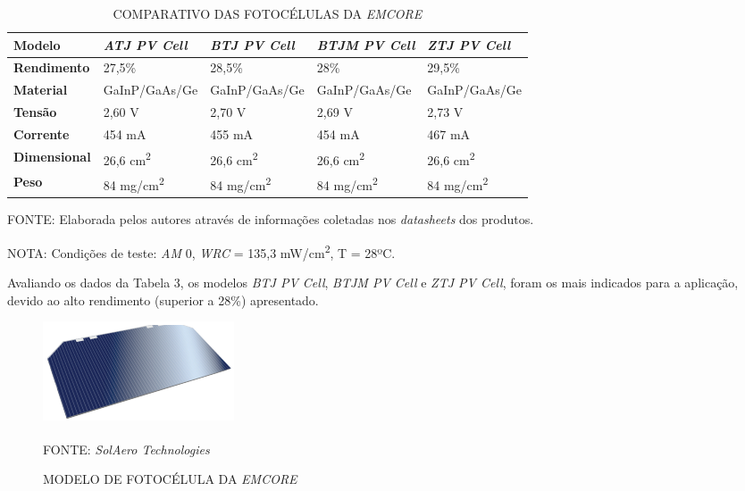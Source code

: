 \documentclass[
	12pt,				%
	openright,			%
	oneside,			%
	a4paper,			%
	english,			%
	french,				%
	spanish,			%
	brazil,				%
	oldfontcommands
	]{abntex2}
\begin{document}
	\begin{table}[th]
	\caption{COMPARATIVO DAS FOTOCÉLULAS DA \textit{EMCORE}}
	\begin{tabular}{p{2.5cm}|p{3.1cm}|p{3.1cm}|p{3.1cm}|p{3.1cm}}
		\textbf{Modelo} & \textit{\textbf{ATJ PV Cell}} & \textit{\textbf{BTJ PV Cell}} & \textit{\textbf{BTJM PV Cell}} & \textit{\textbf{ZTJ PV Cell}} \\
		\hline
		\textbf{Rendimento} & 27,5\% & 28,5\% & 28\% & 29,5\% \\
		\hline
		\textbf{Material} & GaInP/GaAs/Ge & GaInP/GaAs/Ge & GaInP/GaAs/Ge & GaInP/GaAs/Ge\\
		\hline
		\textbf{Tensão} & 2,60 V & 2,70 V & 2,69 V & 2,73 V\\
		\hline
		\textbf{Corrente} & 454 mA & 455 mA & 454 mA & 467 mA\\
		\hline
		\textbf{Dimensional} & 26,6 cm\textsuperscript{2} & 26,6 cm\textsuperscript{2} & 26,6 cm\textsuperscript{2} & 26,6 cm\textsuperscript{2}\\
		\hline
		\textbf{Peso} & 84 mg/cm\textsuperscript{2} & 84 mg/cm\textsuperscript{2} & 84 mg/cm\textsuperscript{2} & 84 mg/cm\textsuperscript{2}\\
	\end{tabular}
	
	\begin{small}
	\vspace{3pt}
		FONTE: Elaborada pelos autores através de informações coletadas nos \textit{datasheets} dos produtos.
	\end{small}
	\begin{footnotesize}
		NOTA: Condições de teste: \textit{AM} 0, \textit{WRC} = 135,3 mW/cm\textsuperscript{2}, T = 28ºC.
	\end{footnotesize}
	\end{table}
	
	Avaliando os dados da Tabela 3, os modelos \textit{BTJ PV Cell}, \textit{BTJM PV Cell} e \textit{ZTJ PV Cell}, foram os mais indicados para a aplicação, devido ao alto rendimento (superior a 28\%) apresentado.
	
	\begin{figure}[th]
		\caption{MODELO DE FOTOCÉLULA DA \textit{EMCORE}}
		\centering
		\includegraphics[width=0.5\linewidth]{./figs/ZTJ}
			
		\begin{small}
			FONTE: \textit{SolAero Technologies}\textsuperscript{\cite{Emcore3}}
		\end{small}		
	\end{figure}
	
\end{document}
